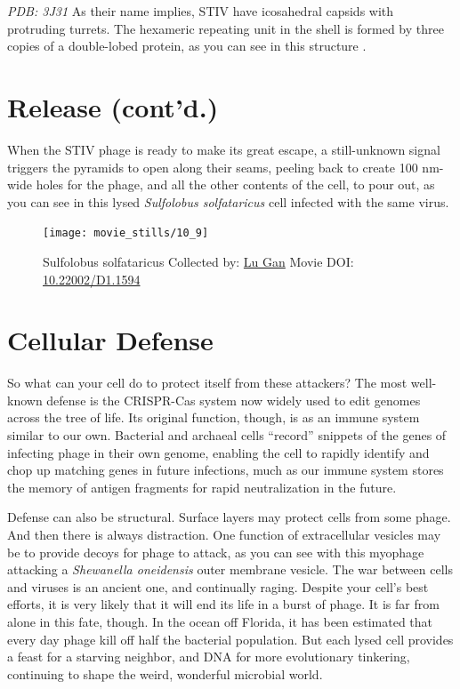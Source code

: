 \documentclass[]{tufte-book}
\begin{document}
\emph{PDB: 3J31} As their name implies, STIV have icosahedral capsids
with protruding turrets. The hexameric repeating unit in the shell is
formed by three copies of a double-lobed protein, as you can see in this
structure \citep{veesler2013}.

\section{Release (cont'd.)}\label{release-contd.}

When the STIV phage is ready to make its great escape, a still-unknown
signal triggers the pyramids to open along their seams, peeling back to
create 100 nm-wide holes for the phage, and all the other contents of
the cell, to pour out, as you can see in this lysed \emph{Sulfolobus
solfataricus} cell infected with the same virus.





\begin{figure}
\texttt{[image: movie\_stills/10\_9]} \caption[Sulfolobus solfataricus Collected by:
\protect\hyperlink{lu_gan}{Lu Gan} Movie DOI:
\href{https://doi.org/10.22002/D1.1594}{10.22002/D1.1594}]{Sulfolobus solfataricus Collected by:
\protect\hyperlink{lu_gan}{Lu Gan} Movie DOI:
\href{https://doi.org/10.22002/D1.1594}{10.22002/D1.1594}}\label{fig:10-9}
\end{figure}

\section{Cellular Defense}\label{cellular-defense}

So what can your cell do to protect itself from these attackers? The
most well-known defense is the CRISPR-Cas system now widely used to edit
genomes across the tree of life. Its original function, though, is as an
immune system similar to our own. Bacterial and archaeal cells
``record'' snippets of the genes of infecting phage in their own genome,
enabling the cell to rapidly identify and chop up matching genes in
future infections, much as our immune system stores the memory of
antigen fragments for rapid neutralization in the future.

Defense can also be structural. Surface layers may protect cells from
some phage. And then there is always distraction. One function of
extracellular vesicles may be to provide decoys for phage to attack, as
you can see with this myophage attacking a \emph{Shewanella oneidensis}
outer membrane vesicle. The war between cells and viruses is an ancient
one, and continually raging. Despite your cell's best efforts, it is
very likely that it will end its life in a burst of phage. It is far
from alone in this fate, though. In the ocean off Florida, it has been
estimated that every day phage kill off half the bacterial population.
But each lysed cell provides a feast for a starving neighbor, and DNA
for more evolutionary tinkering, continuing to shape the weird,
wonderful microbial world.
\end{document}
